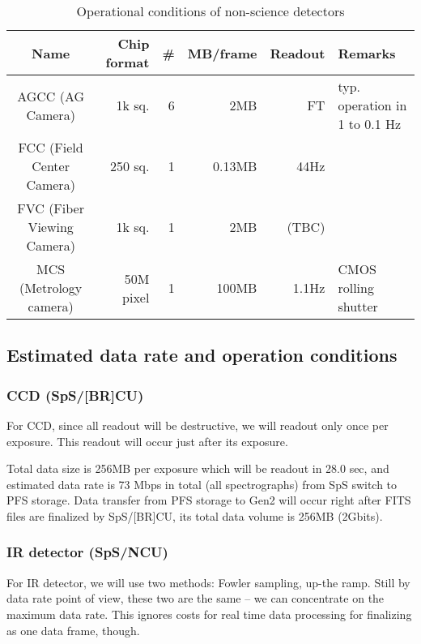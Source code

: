 \documentclass[a4paper,notitlepage]{article}
\begin{document}
\begin{table}[htb]
\caption{Operational conditions of non-science detectors}
\label{datarate-cond-other}
\begin{center}
\begin{tabular}{c||r|r|r|r|l}
Name & Chip format & \# & MB/frame & Readout & Remarks \\
\hline
AGCC (AG Camera) & 1k sq. & 6 & 2MB & FT & typ. operation in 1 to 0.1 Hz \\
FCC (Field Center Camera) & 250 sq. & 1 & 0.13MB & 44Hz & \\
FVC (Fiber Viewing Camera) & 1k sq. & 1 & 2MB & (TBC) & \\
\hline
MCS (Metrology camera) & 50M pixel & 1 & 100MB & 1.1Hz & CMOS rolling shutter \\
\end{tabular}
\end{center}
\end{table}

\subsection{Estimated data rate and operation conditions}

\subsubsection{CCD (SpS/[BR]CU)}

For CCD, since all readout will be destructive, we will readout only once 
per exposure. This readout will occur just after its exposure.

Total data size is 256MB per exposure which will be readout in 28.0 sec, 
and estimated data rate is 73 Mbps in total (all spectrographs) from SpS 
switch to PFS storage. 
Data transfer from PFS storage to Gen2 will occur right after FITS files are 
finalized by SpS/[BR]CU, its total data volume is 256MB (2Gbits). 


\subsubsection{IR detector (SpS/NCU)}

For IR detector, we will use two methods: Fowler sampling, up-the ramp. 
Still by data rate point of view, these two are the same -- we can concentrate 
on the maximum data rate. This ignores costs for real time data processing for 
finalizing as one data frame, though. 
\end{document}
